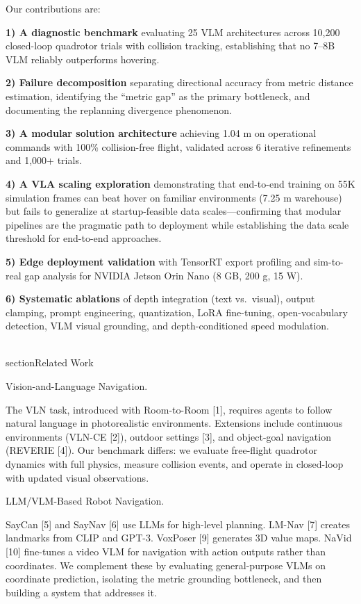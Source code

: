 \documentclass[conference]{IEEEtran}
\begin{document}
Our contributions are:

\textbf{1) A diagnostic benchmark} evaluating 25 VLM architectures
across 10,200 closed-loop quadrotor trials with collision tracking,
establishing that no 7--8B VLM reliably outperforms hovering.

\textbf{2) Failure decomposition} separating directional accuracy from
metric distance estimation, identifying the ``metric gap'' as the
primary bottleneck, and documenting the replanning divergence
phenomenon.

\textbf{3) A modular solution architecture} achieving 1.04 m on
operational commands with 100\% collision-free flight, validated across
6 iterative refinements and 1,000+ trials.

\textbf{4) A VLA scaling exploration} demonstrating that end-to-end
training on 55K simulation frames can beat hover on familiar
environments (7.25 m warehouse) but fails to generalize at
startup-feasible data scales---confirming that modular pipelines are the
pragmatic path to deployment while establishing the data scale threshold
for end-to-end approaches.

\textbf{5) Edge deployment validation} with TensorRT export profiling
and sim-to-real gap analysis for NVIDIA Jetson Orin Nano (8 GB, 200 g,
15 W).

\textbf{6) Systematic ablations} of depth integration (text vs.~visual),
output clamping, prompt engineering, quantization, LoRA fine-tuning,
open-vocabulary detection, VLM visual grounding, and depth-conditioned
speed modulation.

\\section{Related Work}\label{ii.-related-work}

Vision-and-Language Navigation.

The VLN task, introduced with Room-to-Room [1], requires agents to
follow natural language in photorealistic environments. Extensions
include continuous environments (VLN-CE [2]), outdoor settings
[3], and object-goal navigation (REVERIE [4]). Our benchmark
differs: we evaluate free-flight quadrotor dynamics with full physics,
measure collision events, and operate in closed-loop with updated visual
observations.

LLM/VLM-Based Robot Navigation.

SayCan [5] and SayNav [6] use LLMs for high-level planning.
LM-Nav [7] creates landmarks from CLIP and GPT-3. VoxPoser [9]
generates 3D value maps. NaVid [10] fine-tunes a video VLM for
navigation with action outputs rather than coordinates. We complement
these by evaluating general-purpose VLMs on coordinate prediction,
isolating the metric grounding bottleneck, and then building a system
that addresses it.
\end{document}
